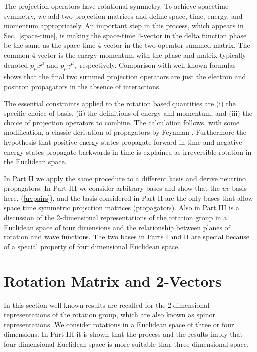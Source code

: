 \documentclass[a4paper,12pt]{article}
\begin{document}
	The projection operators have rotational symmetry. To achieve spacetime symmetry, we add two projection matrices and define space, time, energy, and momentum appropriately. An important step in this process, which appears in Sec.~\ref{space-time}, is making the space-time 4-vector in the delta function phase be the same as the space-time 4-vector in the two operator summed matrix. The common 4-vector is the energy-momentum with the phase and matrix typically denoted $p_{\mu} x^{\mu}$ and  $p_{\mu} \gamma^{\mu},$ respectively. Comparison with well-known formulas shows that the final two summed projection operators are just the electron and positron propagators in the absence of interactions.


	The essential constraints applied to the rotation based quantities are (i) the specific choice of basis, (ii) the definitions of energy and momentum, and (iii) the choice of projection operators to combine. The calculation follows, with some modification, a classic derivation of propagators by Feynman \cite{feynman1}. Furthermore the hypothesis that positive energy states propagate forward in time and negative energy states propagate backwards in time is explained as irreversible rotation in the Euclidean space.

	In Part II we apply the same procedure to a different basis and derive neutrino propagators. In Part III we consider arbitrary bases and show that the  $uv$ basis here, (\ref{uvpairs}), and the basis considered in Part II are the only bases that allow space time symmetric projection matrices (propagators). Also in Part III is a discussion of the 2-dimensional representations of the rotation group in a Euclidean space of four dimensions and the relationship between planes of rotation and wave functions. The two bases in Parts I and II are special because of a special property of four dimensional Euclidean space.



\section{Rotation Matrix and 2-Vectors} \label{2d} %

	In this section well known results are recalled for the 2-dimensional representations of the rotation group, which are also known as spinor representations. We consider rotations in a Euclidean space of three or four dimensions. In Part III it is shown that the process and the results imply that four dimensional Euclidean space is more suitable than three dimensional space.  
\end{document}
